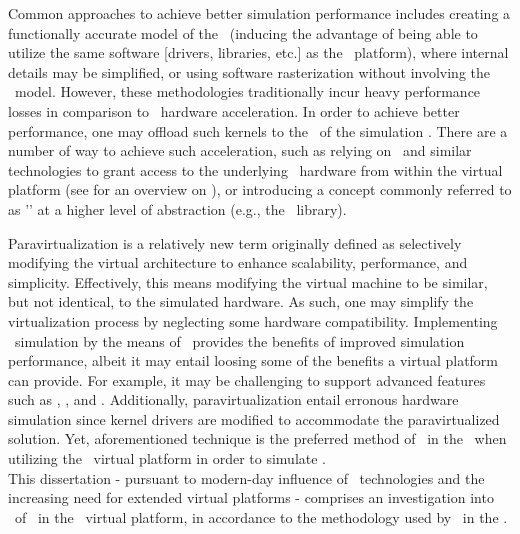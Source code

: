 Common approaches to achieve better simulation performance includes creating a functionally accurate model of the \dvttermgpu\ (inducing the advantage of being able to utilize the same software [drivers, libraries, etc.] as the \dvttermhost\ platform), where internal details may be simplified, or using software rasterization without involving the \dvttermgpu\ model.
However, these methodologies traditionally incur heavy performance losses in comparison to \dvttermgpu\ hardware acceleration.
In order to achieve better performance, one may offload such kernels to the \dvttermgpu\ of the simulation \dvttermhost .
There are a number of way to achieve such acceleration, such as relying on \dvttermpcipassthrough\ and similar technologies to grant access to the underlying \dvttermhost\ hardware from within the virtual platform (see  for an overview on \dvttermpcipassthrough ), or introducing a concept commonly referred to as '\dvttermparavirtualization ' at a higher level of abstraction (e.g., the \dvttermopengl\ library).

Paravirtualization is a relatively new term originally defined as selectively modifying the virtual architecture to enhance scalability, performance, and simplicity.
Effectively, this means modifying the virtual machine to be similar, but not identical, to the simulated hardware.
As such, one may simplify the virtualization process by neglecting some hardware compatibility.
Implementing \dvttermgpu\ simulation by the means of \dvttermparavirtualization\ provides the benefits of improved simulation performance, albeit it may entail loosing some of the benefits a virtual platform can provide.
For example, it may be challenging to support advanced features such as \dvttermdeterministicexecution , \dvttermcheckpointing , and \dvttermreverseexecution .
Additionally, paravirtualization entail erronous hardware simulation since kernel drivers are modified to accommodate the paravirtualized solution.
Yet, aforementioned technique is the preferred method of \dvttermgoogle\ in the \dvttermandroidsdk\ when utilizing the \dvttermqemu\ virtual platform in order to simulate \dvttermopengles .\\

\noindent
This dissertation - pursuant to  modern-day influence of \dvttermgpu\ technologies and the increasing need for extended virtual platforms - comprises an investigation into \dvttermparavirtualization\ of \dvttermopengles\ in the \dvttermsimics\ virtual platform, in accordance to the methodology used by \dvttermgoogle\ in the \dvttermandroidsdk .


